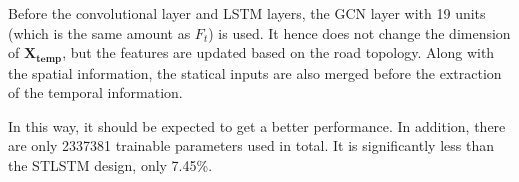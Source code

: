 Before the convolutional layer and LSTM layers, the GCN layer with 19 units (which is the same amount as $F_t$) is used. 
It hence does not change the dimension of $\mathbf{X_{temp}}$, but the features are updated based on the road topology.
Along with the spatial information, the statical inputs are also merged before the extraction of the temporal information.

In this way, it should be expected to get a better performance.
In addition, there are only 2337381 trainable parameters used in total. It is significantly less than the STLSTM design, only 7.45\%.
